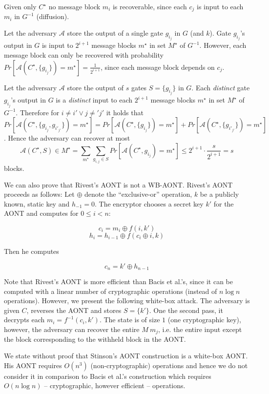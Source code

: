 \begin{myproof}
Given only $C^\star$ no message block $m_i$ is recoverable, since each $c_j$ is input to each $m_i$ in $G^{-1}$ (diffusion).

Let the adversary $\mathcal{A}$ store the output of a single gate $g_{i_j}$ in $G$ (and $k$).
Gate $g_{i_j}$'s output in $G$ is input to $2^{i + 1}$ message blocks $m^\star$ in set $M^\star$ of $G^{-1}$.
However, each message block can only be recovered with probability $Pr[\mathcal{A}(C^\star, \{ g_{i_j} \}) = m^\star] = \frac{1}{2^{i+1}}$, since each message block depends on $c_j$.

Let the adversary $\mathcal{A}$ store the output of $s$ gates $S = \{ g_{i_j} \}$ in $G$.
Each {\em distinct} gate $g_{i_j}$'s output in $G$ is a {\em distinct} input to each $2^{i + 1}$ message blocks $m^\star$ in set $M^\star$ of $G^{-1}$.
Therefore for $i \neq i' \lor j \neq' j'$ it holds that $Pr[\mathcal{A}(C^\star, \{ g_{i_j}, g_{i'_{j'}} \}) = m^\star] = Pr[\mathcal{A}(C^\star, \{ g_{i_j} \}) = m^\star] + Pr[\mathcal{A}(C^\star, \{ g_{i'_{j'}} \}) = m^\star]$.
Hence the adversary can recover at most 
$$\mathcal{A}(C^\star, S) \in M^\star = \sum_{m^\star} \sum_{g_{i, j} \in S} Pr[\mathcal{A}(C^\star, g_{i_j}) = m^\star] \leq 2^{i+1} \cdot \frac{s}{2^{i+1}} = s$$
blocks.
\end{myproof}

We can also prove that Rivest's AONT \cite{r97} is not a WB-AONT.
Rivest's AONT proceeds as follows:
Let $\oplus$ denote the ``exclusive-or'' operation, $k$ be a publicly known, static key and $h_{-1} = 0$.
The encryptor chooses a secret key $k'$ for the AONT and computes for $0 \leq i < n$:

$$ c_i = m_i \oplus f(i, k') $$
$$ h_i = h_{i-1} \oplus f(c_i \oplus i, k) $$

Then he computes

$$ c_n = k' \oplus h_{n-1} $$

Note that Rivest's AONT is more efficient than Bacis et al.'s, since it can be computed with a linear number of cryptographic operations (instead of $n \log n$ operations).
However, we present the following white-box attack.
The adversary is given $C$, reverses the AONT and stores $S = \{ k' \}$.
One the second pass, it decrypts each $m_i = f^{-1}(c_i, k')$.
The state is of size $1$ (one cryptographic key), however, the adversary can recover the entire $M \ m_j$, i.e. the entire input except the block corresponding to the withheld block in the AONT.

We state without proof that Stinson's AONT construction \cite{Sti01} is a white-box AONT.
His AONT requires $O(n^3)$ (non-cryptographic) operations and hence we do not consider it in comparison to Bacis et al.'s construction which requires $O(n \log n)$ -- cryptographic, however efficient -- operations.
